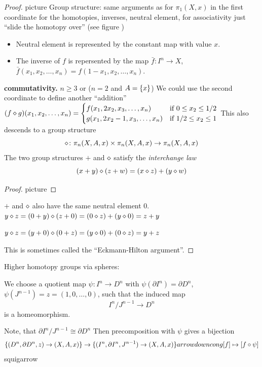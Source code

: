 \documentclass{TemplateLecture}
\begin{document}
\begin{proof}picture
    Group structure: same arguments as for \(\pi_1(X,x)\) in the first coordinate for the homotopies, inverses, neutral element, for associativity just \enquote{slide the homotopy over} (see figure )%
    \begin{itemize}
        \item Neutral element is represented by the constant map with value \(x\).
        \item The inverse of \(f\) is repersented by the map \(\bar f \colon I^n \to X\), \(\bar f(x_1, x_2, \dots, x_n) = f(1-x_1, x_2, \dots, x_n)\).
    \end{itemize}

    \textbf{commutativity.} \(n \geq 3\) or (\(n = 2\) and \(A = \{x\}\)) We could use the second coordinate to define another \enquote{addition} \((f\diamond g)(x_1, x_2, \dots, x_n) = \begin{cases}
        f(x_1, 2x_2, x_3, \dots, x_n) & \text{if } 0 \leq x_2 \leq 1/2 \\
        g(x_1, 2x_2 -1, x_3, \dots, x_n) & \text{if } 1/2 \leq x_2 \leq 1 \\
    \end{cases}\)
    This also descends to a group structure
    \[\diamond \colon \pi_n(X,A,x) \times \pi_n(X,A,x) \to \pi_n(X,A,x)\]
    The two group structures \(+\) and \(\diamond\) satisfy the \emph{interchange law}
    \[(x+y) \diamond (z+w) = (x \diamond z) + (y \diamond w)\]
    \begin{proof}
        picture 
    \end{proof}
    \(+\) and \(\diamond\) also have the same neutral element \(0\).
    \(y \diamond z = (0+y) \diamond (z+0) = (0 \diamond z) + (y \diamond 0) = z+y\)

    \(y\diamond z = (y+ 0) \diamond (0 + z) = (y \diamond 0) + (0 \diamond z) = y + z\)

    This is sometimes called the \enquote{Eckmann-Hilton argument}.
\end{proof}

Higher homotopy groups via spheres:

We choose a quotient map \(\psi \colon I^n \to D^n\) with \(\psi(\partial I^n) = \partial D^n \), \(\psi(J^{n-1}) = z = (1,0,\dots, 0)\), such that the induced map
\[I^n /J^{n-1} \to D^n\]
is a homeomorphism.

Note, that \(\partial I^n /J^{n-1} \cong \partial D^n\)
Then precomposition with \(\psi\) gives a bijection
\[\{(D^n, \partial D^n, z) \to (X,A,x)\} \to \{(I^n, \partial I^n, J^{n-1}) \to (X,A,x)\} arrow down cong  [f] \mapsto [f \circ \psi]\]
squigarrow
\end{document}
